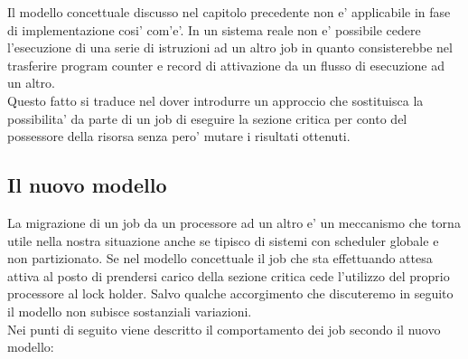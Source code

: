 \documentclass[a4paper,11pt]{article}
\begin{document}
\noindent Il modello concettuale discusso nel capitolo precedente non e' applicabile in fase di implementazione cosi' com'e'. In un sistema reale non e' possibile cedere l'esecuzione di una serie di istruzioni ad un altro job in quanto consisterebbe nel trasferire program counter e record di attivazione da un flusso di esecuzione ad un altro.\\

\noindent Questo fatto si traduce nel dover introdurre un approccio che sostituisca la possibilita' da parte di un job di eseguire la sezione critica per conto del possessore della risorsa senza pero' mutare i risultati ottenuti.\\

\subsection{Il nuovo modello}

\noindent La migrazione di un job da un processore ad un altro e' un meccanismo che torna utile nella nostra situazione anche se tipisco di sistemi con scheduler globale e non partizionato. Se nel modello concettuale il job che sta effettuando attesa attiva al posto di prendersi carico della sezione critica cede l'utilizzo del proprio processore al lock holder. Salvo qualche accorgimento che discuteremo in seguito il modello non subisce sostanziali variazioni.\\

\noindent Nei punti di seguito viene descritto il comportamento dei job secondo il nuovo modello:
\end{document}
